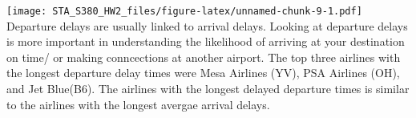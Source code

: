 \documentclass[]{article}
\newenvironment{Shaded}{\begin{snugshade}}{\end{snugshade}}
\newcommand{\KeywordTok}[1]{\textcolor[rgb]{0.13,0.29,0.53}{\textbf{#1}}}
\newcommand{\DataTypeTok}[1]{\textcolor[rgb]{0.13,0.29,0.53}{#1}}
\newcommand{\DecValTok}[1]{\textcolor[rgb]{0.00,0.00,0.81}{#1}}
\newcommand{\StringTok}[1]{\textcolor[rgb]{0.31,0.60,0.02}{#1}}
\newcommand{\CommentTok}[1]{\textcolor[rgb]{0.56,0.35,0.01}{\textit{#1}}}
\newcommand{\OperatorTok}[1]{\textcolor[rgb]{0.81,0.36,0.00}{\textbf{#1}}}
\newcommand{\NormalTok}[1]{#1}
\begin{document}
\begin{Shaded}
\end{Shaded}

\texttt{[image: STA\_S380\_HW2\_files/figure-latex/unnamed-chunk-9-1.pdf]}
Departure delays are usually linked to arrival delays. Looking at
departure delays is more important in understanding the likelihood of
arriving at your destination on time/ or making conncections at another
airport. The top three airlines with the longest departure delay times
were Mesa Airlines (YV), PSA Airlines (OH), and Jet Blue(B6). The
airlines with the longest delayed departure times is similar to the
airlines with the longest avergae arrival delays.
\end{document}
